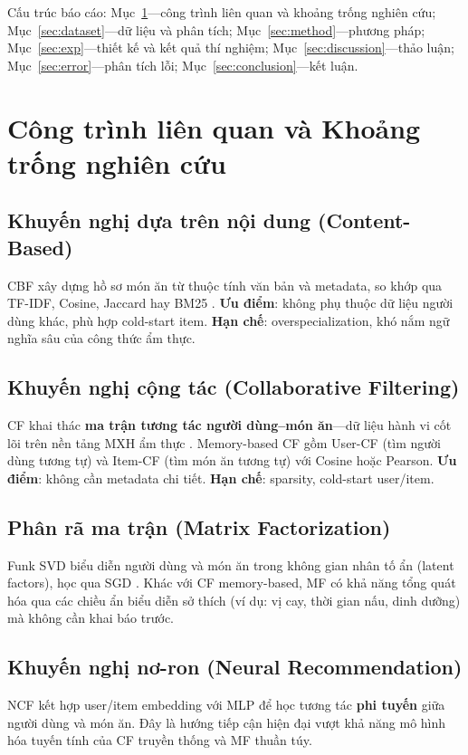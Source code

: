 \documentclass[11pt]{article}
\begin{document}
Cấu trúc báo cáo: Mục~\ref{sec:related}---công trình liên quan và khoảng trống nghiên cứu; Mục~\ref{sec:dataset}---dữ liệu và phân tích; Mục~\ref{sec:method}---phương pháp; Mục~\ref{sec:exp}---thiết kế và kết quả thí nghiệm; Mục~\ref{sec:discussion}---thảo luận; Mục~\ref{sec:error}---phân tích lỗi; Mục~\ref{sec:conclusion}---kết luận.

\section{Công trình liên quan và Khoảng trống nghiên cứu}
\label{sec:related}

\subsection{Khuyến nghị dựa trên nội dung (Content-Based)}
CBF xây dựng hồ sơ món ăn từ thuộc tính văn bản và metadata, so khớp qua TF-IDF, Cosine, Jaccard hay BM25 \cite{lops2011content,tran2024vifoodrec}. \textbf{Ưu điểm}: không phụ thuộc dữ liệu người dùng khác, phù hợp cold-start item. \textbf{Hạn chế}: overspecialization, khó nắm ngữ nghĩa sâu của công thức ẩm thực.

\subsection{Khuyến nghị cộng tác (Collaborative Filtering)}
CF khai thác \textbf{ma trận tương tác người dùng--món ăn}---dữ liệu hành vi cốt lõi trên nền tảng MXH ẩm thực \cite{sarwar2001item}. Memory-based CF gồm User-CF (tìm người dùng tương tự) và Item-CF (tìm món ăn tương tự) với Cosine hoặc Pearson. \textbf{Ưu điểm}: không cần metadata chi tiết. \textbf{Hạn chế}: sparsity, cold-start user/item.

\subsection{Phân rã ma trận (Matrix Factorization)}
Funk SVD biểu diễn người dùng và món ăn trong không gian nhân tố ẩn (latent factors), học qua SGD \cite{koren2009matrix}. Khác với CF memory-based, MF có khả năng tổng quát hóa qua các chiều ẩn biểu diễn sở thích (ví dụ: vị cay, thời gian nấu, dinh dưỡng) mà không cần khai báo trước.

\subsection{Khuyến nghị nơ-ron (Neural Recommendation)}
NCF \cite{he2017neural} kết hợp user/item embedding với MLP để học tương tác \textbf{phi tuyến} giữa người dùng và món ăn. Đây là hướng tiếp cận hiện đại vượt khả năng mô hình hóa tuyến tính của CF truyền thống và MF thuần túy.
\end{document}

